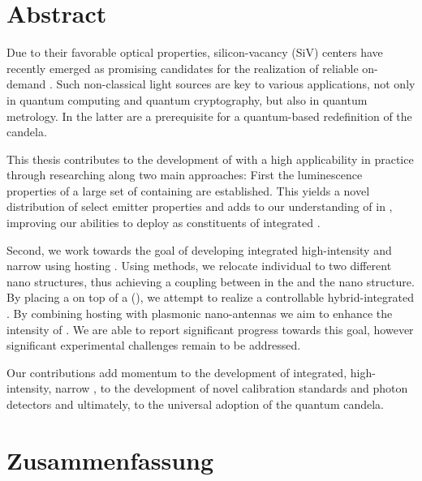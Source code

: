 
\null\vfill

\section*{Abstract}

	Due to their favorable optical properties, silicon-vacancy (SiV) centers have recently emerged as promising candidates for the realization of reliable on-demand \spss. Such non-classical light sources are key to various applications, not only in quantum computing and quantum cryptography, but also in quantum metrology. In the latter \spss are a prerequisite for a quantum-based redefinition of the candela.

	This thesis contributes to the development of \spss with a high applicability in practice through researching \sivs along two main approaches: First the luminescence properties of a large set of \nds containing \sivs are established. This yields a novel distribution of select emitter properties and adds to our understanding of \sivs in \nds, improving our abilities to deploy \sivs as constituents of integrated \spss.

	Second, we work towards the goal of developing integrated high-intensity and narrow \lw \spss using \nds hosting \sivs. Using \pp methods, we relocate individual \nds to two different nano structures, thus achieving a coupling between \sivs in the \nd and the nano structure. By placing a \nd on top of a \vcsel (\VCSEL), we attempt to realize a controllable hybrid-integrated \sps. By combining \nds hosting \sivs with plasmonic nano-antennas we aim to enhance the \pl intensity of \sivs. We are able to report significant progress towards this goal, however significant experimental challenges remain to be addressed.

	Our contributions add momentum to the development of integrated, high-intensity, narrow \lw \spss, to the development of novel calibration standards and photon detectors and ultimately, to the universal adoption of the quantum candela.




\vfill

\newpage

\null\vfill

\section*{Zusammenfassung}

